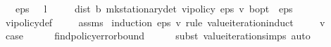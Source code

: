 \begin{isabellebody}
\ \ \ {\isachardoublequoteopen}eps\ {\isachargreater}{\kern0pt}\ {}{\isachardoublequoteclose}\ {\isachardoublequoteopen}l\ {\isachargreater}{\kern0pt}\ {}{\isachardoublequoteclose}\isanewline
\ \ \ {\isachardoublequoteopen}dist\ {\isacharparenleft}{\kern0pt}{\isasymnu}\isactrlsub b\ {\isacharparenleft}{\kern0pt}mk{\isacharunderscore}{\kern0pt}stationary{\isacharunderscore}{\kern0pt}det\ {\isacharparenleft}{\kern0pt}vi{\isacharunderscore}{\kern0pt}policy{\isacharprime}{\kern0pt}\ eps\ v{\isacharparenright}{\kern0pt}{\isacharparenright}{\kern0pt}{\isacharparenright}{\kern0pt}\ {\isasymnu}\isactrlsub b{\isacharunderscore}{\kern0pt}opt\ {\isacharless}{\kern0pt}\ eps{\isachardoublequoteclose}\isanewline
%
\isadelimproof
\ \ %
\endisadelimproof
%
\isatagproof
{}\isamarkupfalse%
\ vi{\isacharunderscore}{\kern0pt}policy{\isacharprime}{\kern0pt}{\isacharunderscore}{\kern0pt}def\ \isanewline
\ \ \isamarkupfalse%
\ assms\isanewline
{}\isamarkupfalse%
\ {\isacharparenleft}{\kern0pt}induction\ eps\ v\ rule{\isacharcolon}{\kern0pt}\ value{\isacharunderscore}{\kern0pt}iteration{\isachardot}{\kern0pt}induct{\isacharparenright}{\kern0pt}\isanewline
\ \ \isamarkupfalse%
\ {\isacharparenleft}{\kern0pt}{}\ v{\isacharparenright}{\kern0pt}\isanewline
\ \ \isamarkupfalse%
\ \isamarkupfalse%
\ {\isacharquery}{\kern0pt}case\isanewline
\ \ \ \ \isamarkupfalse%
\ find{\isacharunderscore}{\kern0pt}policy{\isacharprime}{\kern0pt}{\isacharunderscore}{\kern0pt}error{\isacharunderscore}{\kern0pt}bound\isanewline
\ \ \ \ \isamarkupfalse%
\ {\isacharparenleft}{\kern0pt}subst\ value{\isacharunderscore}{\kern0pt}iteration{\isachardot}{\kern0pt}simps{\isacharparenright}{\kern0pt}\ auto\isanewline
{}\isamarkupfalse%
%
\endisatagproof
{\isafoldproof}%
%
\isadelimproof
\isanewline
%
\endisadelimproof
\isanewline
{}\isamarkupfalse%
\isanewline
%
\isadelimtheory
%
\endisadelimtheory
%
\isatagtheory
{}\isamarkupfalse%
%
\endisatagtheory
{\isafoldtheory}%
%
\isadelimtheory
%
\endisadelimtheory
%
\end{isabellebody}%
\endinput
